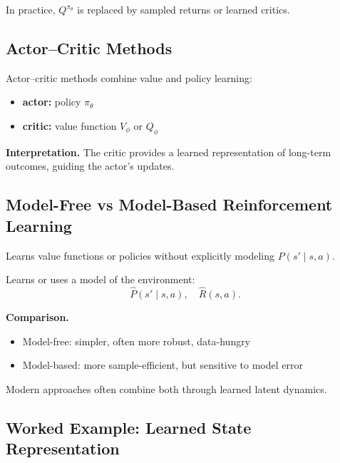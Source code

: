 \begin{remark}
In practice, $Q^{\pi_\theta}$ is replaced by sampled returns or learned critics.
\end{remark}

\subsection{Actor--Critic Methods}

Actor--critic methods combine value and policy learning:
\begin{itemize}
\item \textbf{actor:} policy $\pi_\theta$
\item \textbf{critic:} value function $V_\phi$ or $Q_\phi$
\end{itemize}

\medskip

\noindent
\textbf{Interpretation.}  
The critic provides a learned representation of long-term outcomes, guiding the actor’s updates.

\subsection{Model-Free vs Model-Based Reinforcement Learning}

\begin{definition}
Learns value functions or policies without explicitly modeling $P(s' \mid s,a)$.
\end{definition}

\begin{definition}
Learns or uses a model of the environment:
\[
\hat{P}(s' \mid s,a), \quad \hat{R}(s,a).
\]
\end{definition}

\medskip

\noindent
\textbf{Comparison.}
\begin{itemize}
\item Model-free: simpler, often more robust, data-hungry
\item Model-based: more sample-efficient, but sensitive to model error
\end{itemize}

\begin{remark}
Modern approaches often combine both through learned latent dynamics.
\end{remark}

\subsection{Worked Example: Learned State Representation}

